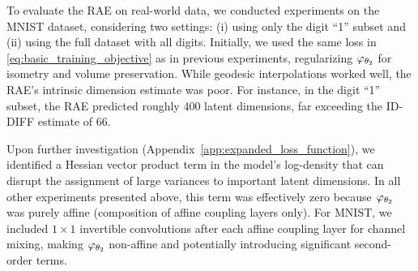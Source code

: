     
    To evaluate the RAE on real-world data, we conducted experiments on the MNIST dataset, considering two settings: (i) using only the digit ``1'' subset and (ii) using the full dataset with all digits. Initially, we used the same loss in \eqref{eq:basic_training_objective} as in previous experiments, regularizing $\varphi_{\theta_2}$ for isometry and volume preservation. While geodesic interpolations worked well, the RAE's intrinsic dimension estimate was poor. For instance, in the digit ``1'' subset, the RAE predicted roughly 400 latent dimensions, far exceeding the ID-DIFF \cite{pmlr-v235-stanczuk24a} estimate of 66.
    
    Upon further investigation (Appendix~\ref{app:expanded_loss_function}), we identified a Hessian vector product term in the model’s log-density that can disrupt the assignment of large variances to important latent dimensions. In all other experiments presented above, this term was effectively zero because $\varphi_{\theta_2}$ was purely affine (composition of affine coupling layers only). For MNIST, we included $1 \times 1$ invertible convolutions after each affine coupling layer for channel mixing, making $\varphi_{\theta_2}$ non-affine and potentially introducing significant second-order terms.
    
